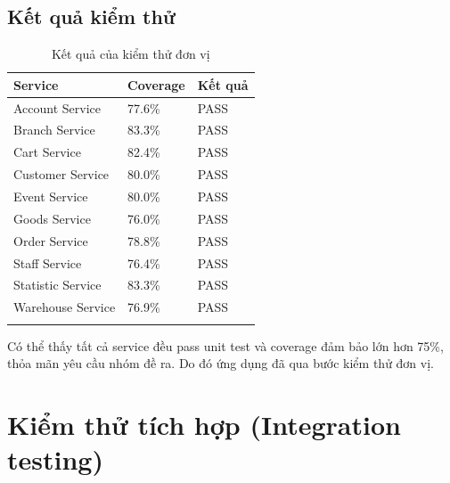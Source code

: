 \subsection{Kết quả kiểm thử}
{
    \setlength\extrarowheight{6pt}
    \begin{longtable}{| p{4cm}| p{4cm}| p{4cm} |}
        \hline
        \textbf{Service}  & \textbf{Coverage} & \textbf{Kết quả} \\
        \hline
        Account Service   & 77.6\%            & PASS             \\
        \hline
        Branch Service    & 83.3\%            & PASS             \\
        \hline
        Cart Service      & 82.4\%            & PASS             \\
        \hline
        Customer Service  & 80.0\%            & PASS             \\
        \hline
        Event Service     & 80.0\%            & PASS             \\
        \hline
        Goods Service     & 76.0\%            & PASS             \\
        \hline
        Order Service     & 78.8\%            & PASS             \\
        \hline
        Staff Service     & 76.4\%            & PASS             \\
        \hline
        Statistic Service & 83.3\%            & PASS             \\
        \hline
        Warehouse Service & 76.9\%            & PASS             \\
        \hline
        \caption{Kết quả của kiểm thử đơn vị}
    \end{longtable}
}

Có thể thấy tất cả service đều pass unit test và coverage đảm bảo lớn hơn 75\%, thỏa mãn yêu cầu nhóm đề ra. Do đó ứng dụng đã qua bước kiểm thử đơn vị.

\section{Kiểm thử tích hợp (Integration testing)}
